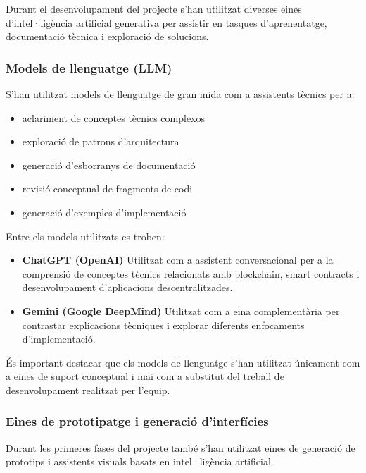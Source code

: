 Durant el desenvolupament del projecte s'han utilitzat diverses eines d'intel·ligència artificial generativa per assistir en tasques d'aprenentatge, documentació tècnica i exploració de solucions.

\subsubsection{Models de llenguatge (LLM)}

S'han utilitzat models de llenguatge de gran mida com a assistents tècnics per a:

\begin{itemize}

\item aclariment de conceptes tècnics complexos
\item exploració de patrons d'arquitectura
\item generació d'esborranys de documentació
\item revisió conceptual de fragments de codi
\item generació d'exemples d'implementació

\end{itemize}

Entre els models utilitzats es troben:

\begin{itemize}

\item \textbf{ChatGPT (OpenAI)}  
Utilitzat com a assistent conversacional per a la comprensió de conceptes tècnics relacionats amb blockchain, smart contracts i desenvolupament d'aplicacions descentralitzades.

\item \textbf{Gemini (Google DeepMind)}  
Utilitzat com a eina complementària per contrastar explicacions tècniques i explorar diferents enfocaments d'implementació.

\end{itemize}

És important destacar que els models de llenguatge s'han utilitzat únicament com a eines de suport conceptual i mai com a substitut del treball de desenvolupament realitzat per l'equip.

\subsubsection{Eines de prototipatge i generació d'interfícies}

Durant les primeres fases del projecte també s'han utilitzat eines de generació de prototips i assistents visuals basats en intel·ligència artificial.

